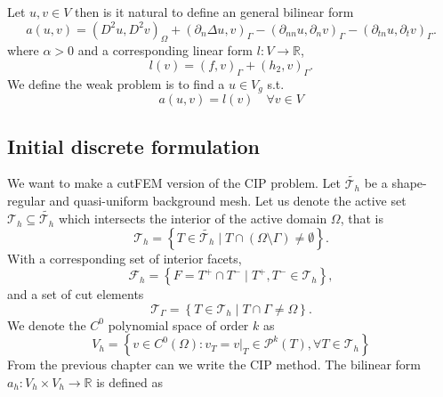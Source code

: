     Let $u,v \in V$ then is it natural to define an general bilinear form  \[
    a( u,v) = ( D^2u, D^2v)_{\Omega } + ( \partial _{n} \Delta u ,v)_{\Gamma } - ( \partial _{nn} u, \partial _{n}v)_{\Gamma } - ( \partial _{tn} u, \partial _{t} v)_{\Gamma }.
    \]
    where $\alpha >0$ and a corresponding linear form $l: V \to \mathbb{R} $,
    \[
    l( v) = ( f ,v)_{\Gamma } +  ( h_{2},v)_{\Gamma } .
    \]
    We define the weak problem is to find a $u \in  V_{g}$ s.t. \[
    a( u,v) = l(v) \quad  \forall v \in V_{}
    \]

\subsection{Initial discrete formulation}%
\label{sub:initial_discrete_formulation}

We want to make a cutFEM version of the CIP problem. Let $\widetilde{\mathcal{T}_{h} } $ be a shape-regular and quasi-uniform background mesh. Let us denote the active set $\mathcal{T} _{h} \subseteq \widetilde{\mathcal{T}_{h}}$ which intersects the interior of the active domain $\Omega $, that is  \[
\mathcal{T} _{h} = \left\{ T \in \widetilde{\mathcal{T} _{h}}  \mid  T \cap (\Omega \setminus \Gamma ) \neq \emptyset    \right\} .
\]
With a corresponding set of interior facets, \[
    \mathcal{F} _{h} = \left\{ F = T^{+} \cap T^{-}  \mid  T^{+}, T^{-} \in \mathcal{T} _{h} \right\},
\]
and a set of cut elements \[
\mathcal{T} _{\Gamma } = \left\{ T \in \mathcal{T} _{h}   \mid  T \cap \Gamma \neq \Omega \right\}.
\]
We denote the $C^{0}$ polynomial space of order $k$ as
\[
V_{h} = \left\{ v \in C^{0}\left( \Omega  \right): v_{T} = v | _{T} \in \mathcal{P} ^{k}\left( T \right), \forall T \in
\mathcal{T}_{h}    \right\}
\]
From the previous chapter can we write the CIP method. The bilinear form $a_{h}:  V_{h}\times  V_{h} \to \mathbb{R} $ is defined as

